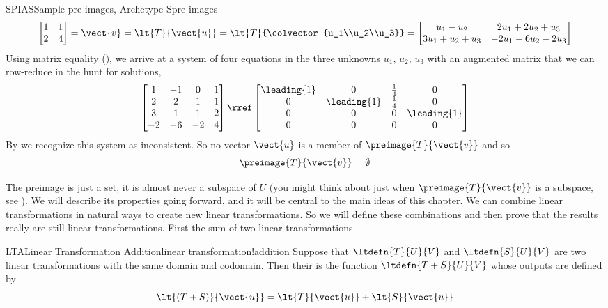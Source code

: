 \begin{example}{SPIAS}{Sample pre-images, Archetype S}{pre-images}
%
\begin{equation*}
\begin{bmatrix}
1&1\\2&4
\end{bmatrix}
=\vect{v}
=\lt{T}{\vect{u}}
=\lt{T}{\colvector{u_1\\u_2\\u_3}}\\
=\begin{bmatrix}
u_1-u_2&2u_1+2u_2+u_3\\
3u_1+u_2+u_3&-2u_1-6u_2-2u_3
\end{bmatrix}
\end{equation*}
%
Using matrix equality (), we arrive at a system of four equations in the three unknowns $u_1,\,u_2,\,u_3$ with an augmented matrix that we can row-reduce in the hunt for solutions,
%
\begin{equation*}
\begin{bmatrix}
1 & -1 & 0 & 1\\
2 & 2 & 1 & 1\\
3 & 1 & 1 & 2\\
-2 & -6 & -2 & 4
\end{bmatrix}
\rref
\begin{bmatrix}
\leading{1} & 0 & \frac{1}{4} &  0\\
0 & \leading{1} & \frac{1}{4} &  0\\
0 & 0 & 0 &  \leading{1}\\
0 & 0 & 0 &  0
\end{bmatrix}
\end{equation*}
%
By  we recognize this system as inconsistent.  So no vector $\vect{u}$ is a member of $\preimage{T}{\vect{v}}$ and so
%
\begin{equation*}
\preimage{T}{\vect{v}}=\emptyset
\end{equation*}
%
\end{example}
%
The preimage is just a set, it is almost never a subspace of $U$ (you might think about just when $\preimage{T}{\vect{v}}$ is a subspace, see ).  We will describe its properties going forward, and it will be central to the main ideas of this chapter.
%
%
We can combine linear transformations in natural ways to create new linear transformations.  So we will define these combinations and then prove that the results really are still linear transformations.  First the sum of two linear transformations.
%
\begin{definition}{LTA}{Linear Transformation Addition}{linear transformation!addition}
Suppose that $\ltdefn{T}{U}{V}$ and $\ltdefn{S}{U}{V}$ are two linear transformations with the same domain and codomain.  Then their  is the function $\ltdefn{T+S}{U}{V}$ whose outputs are defined by
%
\begin{equation*}
\lt{(T+S)}{\vect{u}}=\lt{T}{\vect{u}}+\lt{S}{\vect{u}}
\end{equation*}
%
\end{definition}
